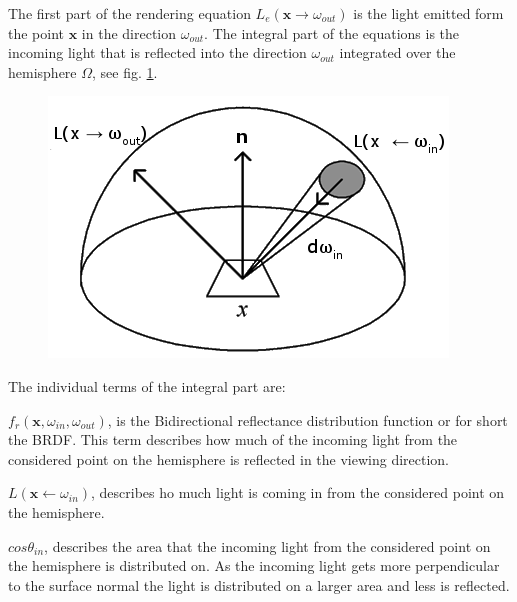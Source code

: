 \documentclass[twocolumn]{article}
\begin{document}
The first part of the rendering equation $L_e(\mathbf{x} \rightarrow \omega_{out})$ is the light emitted form the point $\mathbf{x}$ in the direction $\omega_{out}$. The integral part of the equations is the incoming light that is reflected into the  direction $\omega_{out}$ integrated over the hemisphere $\Omega$, see fig. \ref{fig:hemisphere}.

\begin{figure}[ht]
\centering
\includegraphics[width=1.0\linewidth]{pics/hemisphere.png}
\caption{\label{fig:hemisphere} }
\end{figure}

The individual terms of the integral part are:

\vspace*{1em}

$f_r(\mathbf{x}, \omega_{in}, \omega_{out})$, is the Bidirectional reflectance distribution function or for short the BRDF. This term describes how much of the incoming light from the considered point on the hemisphere is reflected in the viewing direction. %

\vspace*{1em}

$L(\mathbf{x} \leftarrow \omega_{in})$, describes ho much light is coming in from the considered point on the hemisphere.

\vspace*{1em}

$cos\theta_{in}$, describes the area that the incoming light from the considered point on the hemisphere is distributed on. As the incoming light gets more perpendicular to the surface normal the light is distributed on a larger area and less is reflected.
\end{document}
